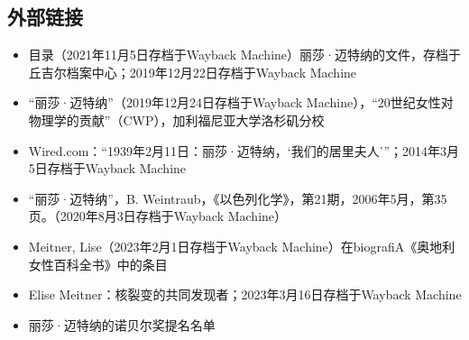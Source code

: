 \subsection{外部链接}
\begin{itemize}
\item 目录（2021年11月5日存档于Wayback Machine）丽莎·迈特纳的文件，存档于丘吉尔档案中心；2019年12月22日存档于Wayback Machine
\item “丽莎·迈特纳”（2019年12月24日存档于Wayback Machine），“20世纪女性对物理学的贡献”（CWP），加利福尼亚大学洛杉矶分校
\item Wired.com：“1939年2月11日：丽莎·迈特纳，‘我们的居里夫人’”；2014年3月5日存档于Wayback Machine
\item “丽莎·迈特纳”，B. Weintraub，《以色列化学》，第21期，2006年5月，第35页。（2020年8月3日存档于Wayback Machine）
\item Meitner, Lise（2023年2月1日存档于Wayback Machine）在biografiA《奥地利女性百科全书》中的条目
\item Elise Meitner：核裂变的共同发现者；2023年3月16日存档于Wayback Machine
\item 丽莎·迈特纳的诺贝尔奖提名名单
\end{itemize}